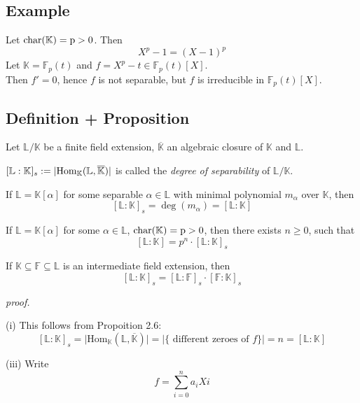 \documentclass[12pt]{book}
\begin{document}
\begin{spacing}{1.3}
\subsection*{Example} %
\titleformat{\subsection}{\normalfont\normalsize\bfseries}{}{0em}{#1 \thesubsection}
Let $\rm{char}(\mathbb{K})=p>0$. Then $$X^p-1=(X-1)^p$$Let $\mathbb{K}=\mathbb{F}_p(t)$ and $f=X^p-t \in \mathbb{F}_p(t)[X]$.\\
Then $f'=0$, hence $f$ is not separable, but $f$ is irreducible in $\mathbb{F}_p(t)[X]$.

\subsection{Definition + Proposition} %
Let $\mathbb{L}/\mathbb{K}$ be a finite field extension, $\overline{\mathbb{K}}$ an algebraic closure of $\mathbb{K}$ and $\mathbb{L}$. 
\begin{compactenum}
\item $[\mathbb{L}:\mathbb{K}]_s:= \vert \rm{Hom}_{\mathbb{K}}(\mathbb{L}, \overline{\mathbb{K}}) \vert$ is called the \textit{degree of separability} of $\mathbb{L}/\mathbb{K}$.
\item If $\mathbb{L}=\mathbb{K}[\alpha]$ for some separable $\alpha \in \mathbb{L}$ with minimal polynomial $m_{\alpha}$ over $\mathbb{K}$, then
$$[\mathbb{L}:\mathbb{K}]_s=\deg(m_{\alpha})=[\mathbb{L}:\mathbb{K}]$$
\item If $\mathbb{L}=\mathbb{K}[\alpha]$ for some $\alpha \in \mathbb{L}$, $\rm{char}(\mathbb{K})=p>0$, then there exists $n \geqslant 0$, such that
$$[\mathbb{L}:\mathbb{K}] = p^n \cdot [\mathbb{L}:\mathbb{K}]_s$$
\item  If $\mathbb{K} \subseteq \mathbb{F} \subseteq \mathbb{L}$ is an intermediate field extension, then
$$[\mathbb{L}:\mathbb{K}]_s=[\mathbb{L}:\mathbb{F}]_s \cdot [\mathbb{F}:\mathbb{K}]_s$$
\end{compactenum}
\textit{proof.}
\begin{compactenum}
\item[(i)] This follows from Propoition 2.6:
$$[\mathbb{L}:\mathbb{K}]_s=\vert \textrm{Hom}_{\mathbb{K}}(\mathbb{L}, \overline{\mathbb{K}}) \vert = \vert \{ \textrm{ different zeroes of } f \} \vert =n = [\mathbb{L}:\mathbb{K}]$$
\item[(iii)] Write 
$$f=\sum_{i=0}^n a_iX{i}$$

\end{compactenum}
\end{spacing}
\end{document}
